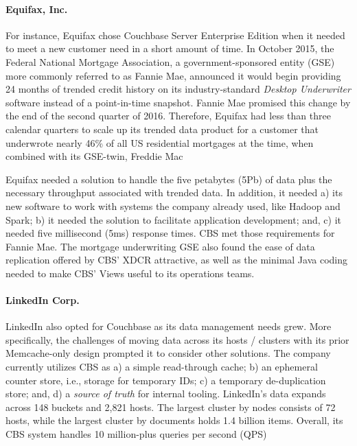 \documentclass[9pt,twocolumn,twoside]{styles/osajnl}
\begin{document}
\paragraph{Equifax, Inc.}
For instance, Equifax chose Couchbase Server Enterprise Edition when it needed to meet a new customer need in a short amount of time.  In October 2015, the Federal National Mortgage Association, a government-sponsored entity (GSE) more commonly referred to as Fannie Mae, announced it would begin providing 24 months of trended credit history on its industry-standard \textit{Desktop Underwriter} software instead of a point-in-time snapshot.  Fannie Mae promised this change by the end of the second quarter of 2016.  Therefore, Equifax had less than three calendar quarters to scale up its trended data product for a customer that underwrote nearly 46\% of all US residential mortgages at the time, when combined with its GSE-twin, Freddie Mac \cite{www-trendeddata-equifax,www-gsemktshare-valuewalk}

Equifax needed a solution to handle the five petabytes (5Pb) of data plus the necessary throughput associated with trended data.  In addition, it needed a) its new software to work with systems the company already used, like Hadoop and Spark; b) it needed the solution to facilitate application development; and, c) it needed five millisecond (5ms) response times.  CBS met those requirements for Fannie Mae.  The mortgage underwriting GSE also found the ease of data replication offered by CBS' XDCR attractive, as well as the minimal Java coding needed to make CBS' Views useful to its operations teams. 
\cite{www-fanniemae-equifax-couchbaseconnect}

\paragraph{LinkedIn Corp.}
LinkedIn also opted for Couchbase as its data management needs grew.  More specifically, the challenges of moving data across its hosts / clusters with its prior Memcache-only design prompted it to consider other solutions.  The company currently utilizes CBS as a) a simple read-through cache; b) an ephemeral counter store, i.e., storage for temporary IDs; c) a temporary de-duplication store; and, d) a \textit{source of truth} for internal tooling.  LinkedIn's data expands across 148 buckets and 2,821 hosts.  The largest cluster by nodes consists of 72 hosts, while the largest cluster by documents holds 1.4 billion items.  Overall, its CBS system handles 10 million-plus queries per second (QPS) \cite{www-linkedin-couchbaseconnect}
\end{document}
